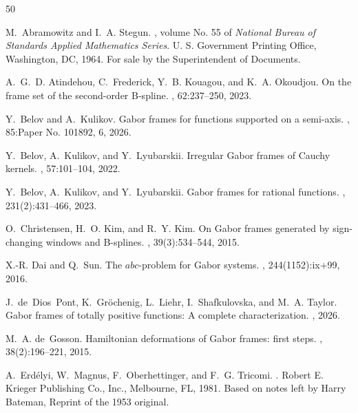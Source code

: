 \documentclass[11pt]{amsart}
\numberwithin{equation}{section}
\begin{document}
\begin{thebibliography}{50}

M.~Abramowitz and I.~A. Stegun.
, volume No. 55 of {\em National Bureau of Standards Applied Mathematics Series}.
\newblock U. S. Government Printing Office, Washington, DC, 1964.
\newblock For sale by the Superintendent of Documents.

A.~G.~D. Atindehou, C.~Frederick, Y.~B. Kouagou, and K.~A. Okoudjou.
\newblock On the frame set of the second-order {B}-spline.
, 62:237--250, 2023.

Y.~Belov and A.~Kulikov.
\newblock Gabor frames for functions supported on a semi-axis.
, 85:Paper No. 101892, 6, 2026.

Y.~Belov, A.~Kulikov, and Y.~Lyubarskii.
\newblock Irregular {G}abor frames of {C}auchy kernels.
, 57:101--104, 2022.

Y.~Belov, A.~Kulikov, and Y.~Lyubarskii.
\newblock Gabor frames for rational functions.
, 231(2):431--466, 2023.

O.~Christensen, H.~O. Kim, and R.~Y. Kim.
\newblock On {G}abor frames generated by sign-changing windows and {B}-splines.
, 39(3):534--544, 2015.

X.-R. Dai and Q.~Sun.
\newblock The {${abc}$}-problem for {G}abor systems.
, 244(1152):ix+99, 2016.

J.~de~Dios~Pont, K.~Gr\"ochenig, L.~Liehr, I.~Shafkulovska, and M.~A. Taylor.
\newblock Gabor frames of totally positive functions: A complete characterization.
, 2026.

M.~A. de~Gosson.
\newblock Hamiltonian deformations of {G}abor frames: first steps.
, 38(2):196--221, 2015.

A.~Erd\'elyi, W.~Magnus, F.~Oberhettinger, and F.~G. Tricomi.
.
\newblock Robert E. Krieger Publishing Co., Inc., Melbourne, FL, 1981.
\newblock Based on notes left by Harry Bateman, Reprint of the 1953 original.


\end{thebibliography}
\end{document}
